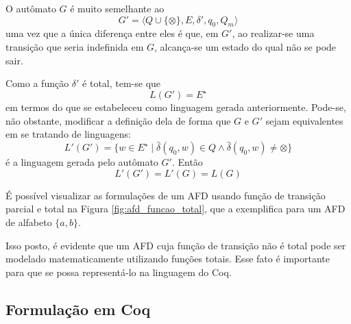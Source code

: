 O autômato $G$ é muito semelhante ao $$G' = \langle Q \cup \{ \otimes \}, E, \delta', q_0, Q_m \rangle$$ uma vez que a única diferença entre eles é que, em $G'$, ao realizar-se uma transição que seria indefinida em $G$, alcança-se um estado do qual não se pode sair.

Como a função $\delta'$ é total, tem-se que $$L(G') = E^\star$$ em termos do que se estabeleceu como linguagem gerada anteriormente. Pode-se, não obstante, modificar a definição dela de forma que $G$ e $G'$ sejam equivalentes em se tratando de linguagens: \begin{equation}
\label{eq:ling_ralo}
L'(G') = \{ w \in E^\star \mid \hat{\delta}(q_0, w) \in Q \wedge \hat{\delta}(q_0, w) \neq \otimes \}
\end{equation} é a linguagem gerada pelo autômato $G'$. Então $$L'(G') = L'(G) = L(G)$$

É possível visualizar as formulações de um AFD usando função de transição parcial e total na Figura \ref{fig:afd_funcao_total}, que a exemplifica para um AFD de alfabeto $\{ a, b \}$.


Isso posto, é evidente que um AFD cuja função de transição não é total pode ser modelado matematicamente utilizando funções totais. Esse fato é importante para que se possa representá-lo na linguagem do Coq.

\subsection{Formulação em Coq}
\label{subsec:afd_coq}

